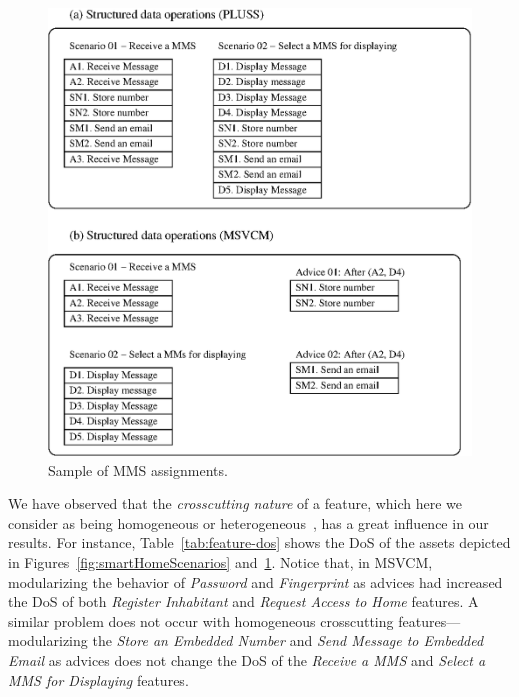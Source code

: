 {\begin{figure}[hbt]
 \begin{center}
  \includegraphics[scale=0.65]{img/comparisonScenarios2.eps}
  \caption{Sample of MMS assignments.}
  \label{fig:MMSScenarios}
  \end{center}
\end{figure}

We have observed that the \emph{crosscutting nature} of a feature, which here we
consider as being homogeneous or heterogeneous~\cite{Apel:2006aa}, has a great influence in our
results. For instance, Table~\ref{tab:feature-dos} shows the DoS of
the assets depicted in Figures~\ref{fig:smartHomeScenarios}
and~\ref{fig:MMSScenarios}. Notice that, in MSVCM, modularizing the behavior
of \emph{Password} and \emph{Fingerprint} as advices had
increased the DoS of both \emph{Register Inhabitant} and \emph{Request Access to
Home} features. A similar problem does not occur with homogeneous
crosscutting features--- modularizing the
\emph{Store an Embedded Number} and \emph{Send Message to Embedded Email} as advices does not 
change the DoS of the \emph{Receive a MMS} and \emph{Select a MMS for Displaying} features.    

}
